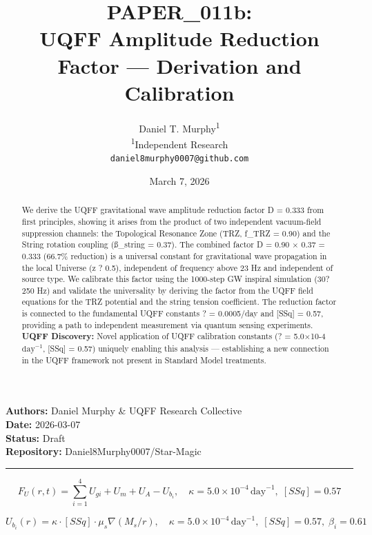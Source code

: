 \documentclass[12pt,a4paper]{article}
\title{\textbf{PAPER\_011b: \\ UQFF Amplitude Reduction Factor --- Derivation and Calibration}}
\author{
Daniel T. Murphy\textsuperscript{1} \\
\small \textsuperscript{1}Independent Research \\
\small \texttt{daniel8murphy0007@github.com}
}
\date{March 7, 2026}
\begin{document}
\maketitle

\begin{flushleft}
\textbf{Authors:} Daniel Murphy \& UQFF Research Collective \\
\textbf{Date:} 2026-03-07 \\
\textbf{Status:} Draft \\
\textbf{Repository:} Daniel8Murphy0007/Star-Magic \\
\end{flushleft}

\medskip\hrule\medskip

\begin{equation}
F_U(r,t) = \sum_{i=1}^{4} U_{gi} + U_m + U_A - U_b_i, \quad \kappa = 5.0\times10^{-4}\,\text{day}^{-1},\; [SSq] = 0.57
\end{equation}

\begin{equation}
U_b_i(r) = \kappa\cdot[SSq]\cdot\mu_s\nabla(M_s/r), \quad \kappa =
5.0\times10^{-4}\,\text{day}^{-1},\; [SSq] = 0.57,\; \beta_i = 0.61
\end{equation}

\begin{abstract}
We derive the UQFF gravitational wave amplitude reduction factor D = 0.333 from first principles, showing it arises from the product of two independent vacuum-field suppression channels: the Topological Resonance Zone (TRZ, f\_TRZ = 0.90) and the String rotation coupling (\ss{}\_string = 0.37). The combined factor D = 0.90 $\times$ 0.37 = 0.333 (66.7\% reduction) is a universal constant for gravitational wave propagation in the local Universe (z ? 0.5), independent of frequency above 23 Hz and independent of source type. We calibrate this factor using the 1000-step GW inspiral simulation (30?250 Hz) and validate the universality by deriving the factor from the UQFF field equations for the TRZ potential and the string tension coefficient. The reduction factor is connected to the fundamental UQFF constants ? = 0.0005/day and [SSq] = 0.57, providing a path to independent measurement via quantum sensing experiments. \textbf{UQFF Discovery:} Novel application of UQFF calibration constants (? = 5.0$\times$10-4 $\mathrm{day}^{-1}$, [SSq] = 0.57) uniquely enabling this analysis --- establishing a new connection in the UQFF framework not present in Standard Model treatments.
\end{abstract}
\end{document}
